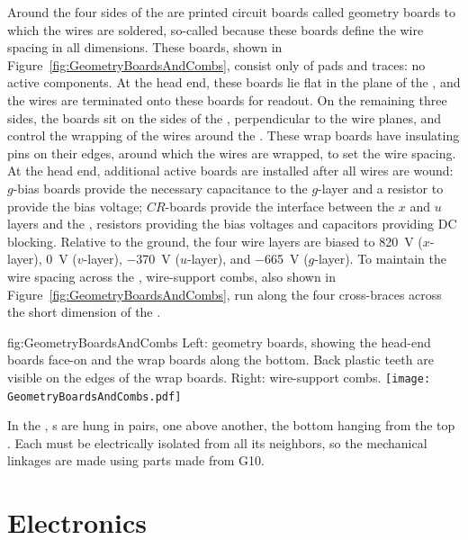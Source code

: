Around the four sides of the  are printed circuit boards called geometry boards to which the wires are soldered, so-called because these boards define the wire spacing in all dimensions. These boards, shown in Figure~\ref{fig:GeometryBoardsAndCombs}, consist only of pads and traces: no active components. At the head end, these boards lie flat in the plane of the , and the wires are terminated onto these boards for readout. On the remaining three sides, the boards sit on the sides of the , perpendicular to the wire planes, and control the wrapping of the wires around the . These wrap boards have insulating pins on their edges, around which the wires are wrapped, to set the wire spacing. At the head end, additional active boards are installed after all wires are wound: $g$-bias boards provide the necessary capacitance to the $g$-layer and a resistor to provide the bias voltage; $CR$-boards provide the interface between the $x$ and $u$ layers and the , resistors providing the bias voltages and capacitors providing DC blocking. Relative to the ground, the four wire layers are biased to \SI{820}{\volt} ($x$-layer), \SI{0}{\volt} ($v$-layer), \SI{-370}{\volt} ($u$-layer), and \SI{-665}{\volt} ($g$-layer). To maintain the wire spacing across the , wire-support combs, also shown in Figure~\ref{fig:GeometryBoardsAndCombs}, run along the four cross-braces across the short dimension of the .

\begin{dunefigure}{fig:GeometryBoardsAndCombs}
{Left: geometry boards, showing the head-end boards face-on and the wrap boards along the bottom. Back plastic teeth are visible on the edges of the wrap boards. Right: wire-support combs.}
\texttt{[image: GeometryBoardsAndCombs.pdf]}
\end{dunefigure}

In the , s are hung in pairs, one above another, the bottom  hanging from the top . Each  must be electrically isolated from all its neighbors, so the mechanical linkages are made using parts made from G10.


\section{Electronics}
\label{sec:fdsp-exec-electronics}

